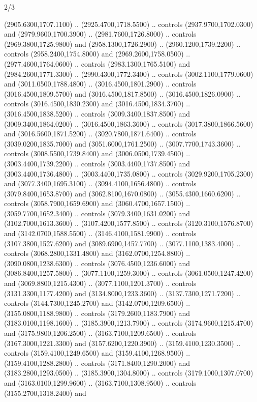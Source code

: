 \begin{flagdescription}{2/3}
\begin{scope}[shift={(0.5\flaglength,0.5)},scale=\flagwidth/130]
\begin{scope}[y=0.01mm, x=0.01mm,shift={(-3365,-2250)}]
  (2905.6300,1707.1100) .. (2925.4700,1718.5500) .. controls
  (2937.9700,1702.0300) and (2979.9600,1700.3900) .. (2981.7600,1726.8000) ..
  controls (2969.3800,1725.9800) and (2958.1300,1726.2900) ..
  (2960.1200,1739.2200) .. controls (2958.2400,1754.8000) and
  (2969.2600,1758.0500) .. (2977.4600,1764.0600) .. controls
  (2983.1300,1765.5100) and (2984.2600,1771.3300) .. (2990.4300,1772.3400) ..
  controls (3002.1100,1779.0600) and (3011.0500,1788.4800) ..
  (3016.4500,1801.2900) .. controls (3016.4500,1809.5700) and
  (3016.4500,1817.8500) .. (3016.4500,1826.0900) .. controls
  (3016.4500,1830.2300) and (3016.4500,1834.3700) .. (3016.4500,1838.5200) ..
  controls (3009.3400,1837.8500) and (3009.3400,1864.0200) ..
  (3016.4500,1863.3600) .. controls (3017.3800,1866.5600) and
  (3016.5600,1871.5200) .. (3020.7800,1871.6400) .. controls
  (3039.0200,1835.7000) and (3051.6000,1761.2500) .. (3007.7700,1743.3600) ..
  controls (3008.5500,1739.8400) and (3006.0500,1739.4500) ..
  (3003.4400,1739.2200) .. controls (3003.4400,1737.8500) and
  (3003.4400,1736.4800) .. (3003.4400,1735.0800) .. controls
  (3029.9200,1705.2300) and (3077.3400,1695.3100) .. (3094.4100,1656.4800) ..
  controls (3079.8400,1653.8700) and (3062.8100,1670.0800) ..
  (3055.4300,1660.6200) .. controls (3058.7900,1659.6900) and
  (3060.4700,1657.1500) .. (3059.7700,1652.3400) .. controls
  (3079.3400,1631.0200) and (3102.7000,1613.3600) .. (3107.4200,1577.8500) ..
  controls (3120.3100,1576.8700) and (3142.0700,1588.5500) ..
  (3146.4100,1581.9900) .. controls (3107.3800,1527.6200) and
  (3089.6900,1457.7700) .. (3077.1100,1383.4000) .. controls
  (3068.2800,1331.4800) and (3162.0700,1254.8800) .. (3090.0800,1238.6300) ..
  controls (3076.4500,1236.6000) and (3086.8400,1257.5800) ..
  (3077.1100,1259.3000) .. controls (3061.0500,1247.4200) and
  (3069.8800,1215.4300) .. (3077.1100,1201.3700) .. controls
  (3131.3300,1177.4200) and (3134.8000,1233.3600) .. (3137.7300,1271.7200) ..
  controls (3144.7300,1245.2700) and (3142.0700,1209.6500) ..
  (3155.0800,1188.9800) .. controls (3179.2600,1183.7900) and
  (3183.0100,1198.1600) .. (3185.3900,1213.7900) .. controls
  (3174.9600,1215.4700) and (3175.9800,1206.2500) .. (3163.7100,1209.6500) ..
  controls (3167.3000,1221.3300) and (3157.6200,1220.3900) ..
  (3159.4100,1230.3500) .. controls (3159.4100,1249.6500) and
  (3159.4100,1268.9500) .. (3159.4100,1288.2800) .. controls
  (3171.8400,1290.2000) and (3183.2800,1293.0500) .. (3185.3900,1304.8000) ..
  controls (3179.1000,1307.0700) and (3163.0100,1299.9600) ..
  (3163.7100,1308.9500) .. controls (3155.2700,1318.2400) and

\end{scope}
\end{scope}
\end{flagdescription}
